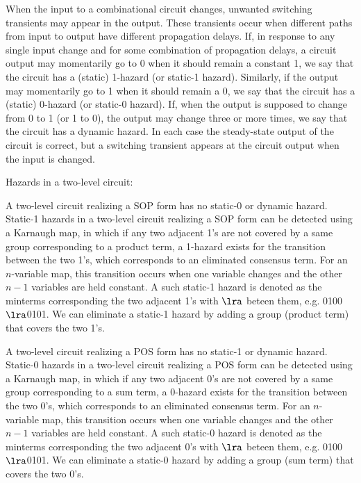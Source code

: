 \documentclass[a4paper,12pt]{report}
\begin{document}
When the input to a combinational circuit changes, unwanted switching transients may appear in the output. These transients occur when different paths from input to output have different propagation delays. If, in response to any single input change and for some combination of propagation delays, a circuit output may momentarily go to 0 when it should remain a constant 1, we say that the circuit has a (static) 1-hazard (or static-1 hazard). Similarly, if the output may momentarily go to 1 when it should remain a 0, we say that the circuit has a (static) 0-hazard (or static-0 hazard). If, when the output is supposed to change from 0 to 1 (or 1 to 0), the output may change three or more times, we say that the circuit has a dynamic hazard. In each case the steady-state output of the circuit is correct, but a switching transient appears at the circuit output when the input is changed.

Hazards in a two-level circuit:
\bit
\item A two-level circuit realizing a SOP form has no static-0 or dynamic hazard. Static-1 hazards in a two-level circuit realizing a SOP form can be detected using a Karnaugh map, in which if any two adjacent 1's are not covered by a same group corresponding to a product term, a 1-hazard exists for the transition between the two 1's, which corresponds to an eliminated consensus term. For an $n$-variable map, this transition occurs when one variable changes and the other $n-1$ variables are held constant. A such static-1 hazard is denoted as the minterms corresponding the two adjacent 1's with $\lra$ beteen them, e.g. 0100$\lra$0101. We can eliminate a static-1 hazard by adding a group (product term) that covers the two 1's.
\item A two-level circuit realizing a POS form has no static-1 or dynamic hazard. Static-0 hazards in a two-level circuit realizing a POS form can be detected using a Karnaugh map, in which if any two adjacent 0's are not covered by a same group corresponding to a sum term, a 0-hazard exists for the transition between the two 0's, which corresponds to an eliminated consensus term. For an $n$-variable map, this transition occurs when one variable changes and the other $n-1$ variables are held constant. A such static-0 hazard is denoted as the minterms corresponding the two adjacent 0's with $\lra$ beteen them, e.g. 0100$\lra$0101. We can eliminate a static-0 hazard by adding a group (sum term) that covers the two 0's.
\eit
\end{document}
